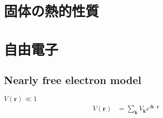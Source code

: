 \documentclass[uplatex,dvipdfmx,a4paper,11pt]{jlreq}
\newcommand{\rr}{\bm{r}}
\newcommand{\kk}{\bm{k}}
\numberwithin{equation}{section}
\theoremstyle{definition}
\begin{document}
\section{固体の熱的性質}
\subsection{}

\section{自由電子}
\subsection{Nearly free electron model}
$V(\rr) \ll 1$
\begin{align}
  V(\rr) & = \sum_{\kk}V_{\kk}e^{i\kk\cdot\rr}
\end{align}
\end{document}
